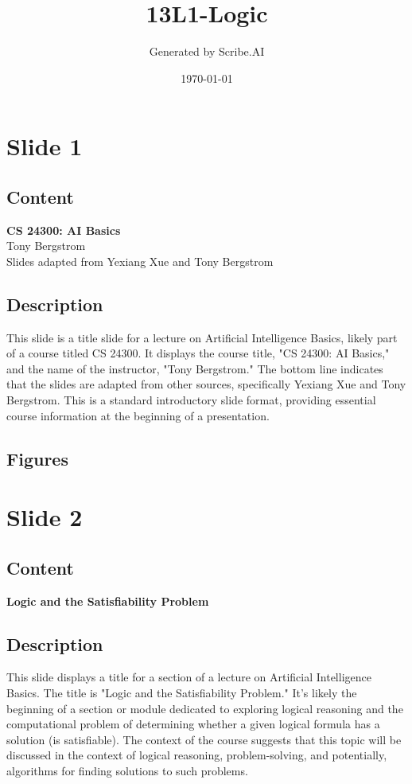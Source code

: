 \documentclass{article}%
\title{13L1{-}Logic}%
\author{Generated by Scribe.AI}%
\date{\today}%
\begin{document}
%
\normalsize%
\maketitle%
\section{Slide 1}%
\label{sec:Slide1}%
\subsection{Content}%

\textbf{CS 24300: AI Basics} \\
Tony Bergstrom \\
Slides adapted from Yexiang Xue and Tony Bergstrom
%
\subsection{Description}%
This slide is a title slide for a lecture on Artificial Intelligence Basics, likely part of a course titled CS 24300.  It displays the course title, "CS 24300: AI Basics," and the name of the instructor, "Tony Bergstrom."  The bottom line indicates that the slides are adapted from other sources, specifically Yexiang Xue and Tony Bergstrom.  This is a standard introductory slide format, providing essential course information at the beginning of a presentation.%
\subsection{Figures}%
\begin{figure}[H]%
\centering%
\end{figure}

%
\newpage%
\section{Slide 2}%
\label{sec:Slide2}%
\subsection{Content}%

\textbf{Logic and the Satisfiability Problem}
%
\subsection{Description}%
This slide displays a title for a section of a lecture on Artificial Intelligence Basics.  The title is "Logic and the Satisfiability Problem."  It's likely the beginning of a section or module dedicated to exploring logical reasoning and the computational problem of determining whether a given logical formula has a solution (is satisfiable).  The context of the course suggests that this topic will be discussed in the context of logical reasoning, problem-solving, and potentially, algorithms for finding solutions to such problems.%
\end{document}
